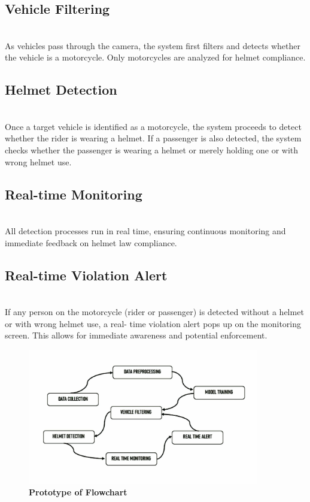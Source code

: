 \begin{refsection}
\subsection {Vehicle Filtering} \\

As vehicles pass through the camera, the system first filters and detects whether the vehicle is a motorcycle. Only motorcycles are analyzed for helmet compliance.


\subsection {Helmet Detection} \\
Once a target vehicle is identified as a motorcycle, the system proceeds to detect whether the rider is wearing a helmet. If a passenger is also detected, the system checks whether the passenger is wearing a helmet or merely holding one or with wrong helmet use.

\subsection {Real-time Monitoring} \\
All detection processes run in real time, ensuring continuous monitoring and immediate feedback on helmet law compliance.

\subsection {Real-time Violation Alert} \\
If any person on the motorcycle (rider or passenger) is detected without a helmet or with wrong helmet use, a real- time violation alert pops up on the monitoring screen. This allows for immediate awareness and potential enforcement.


\begin{figure}[H]
    \centering
    \includegraphics[width=0.9\textwidth]{figures/Fig 5.jpg}
    \caption{\textbf{Prototype of Flowchart}}
    \label{figures/Fig 5.jpg}
\end{figure}


\end{refsection}
